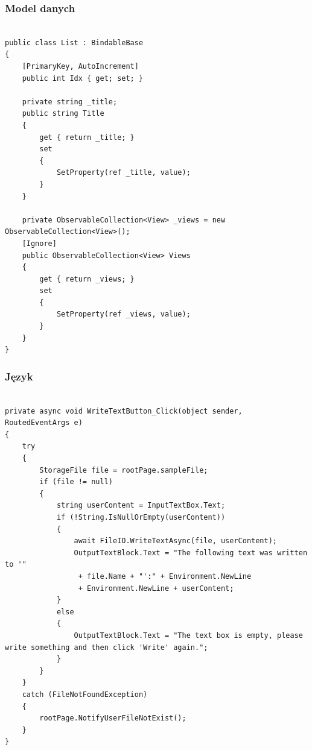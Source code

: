 \begin{frame}[fragile]
\frametitle{Model danych}
 \begin{adjustbox}{width=\textwidth}
\begin{lstlisting}[language=CSharp,basicstyle=\ttfamily]

public class List : BindableBase
{     
    [PrimaryKey, AutoIncrement]
    public int Idx { get; set; }    
	
    private string _title;
    public string Title
    {
        get { return _title; }
        set
        {
            SetProperty(ref _title, value);
        }
    }     
	
    private ObservableCollection<View> _views = new ObservableCollection<View>();
    [Ignore]
    public ObservableCollection<View> Views
    {
        get { return _views; }
        set
        {
            SetProperty(ref _views, value);                
        }
    }
}

\end{lstlisting}
\end{adjustbox}
\end{frame}

\begin{frame}[fragile]
\frametitle{Język \Csharp}
 \begin{adjustbox}{width=\textwidth}
\begin{lstlisting}[language=CSharp,basicstyle=\ttfamily]

private async void WriteTextButton_Click(object sender, RoutedEventArgs e) 
{ 
    try 
    {         
        StorageFile file = rootPage.sampleFile; 
        if (file != null) 
        { 
            string userContent = InputTextBox.Text; 
            if (!String.IsNullOrEmpty(userContent)) 
            { 
                await FileIO.WriteTextAsync(file, userContent); 
                OutputTextBlock.Text = "The following text was written to '"
                 + file.Name + "':" + Environment.NewLine 
                 + Environment.NewLine + userContent; 
            } 
            else 
            { 
                OutputTextBlock.Text = "The text box is empty, please write something and then click 'Write' again."; 
            } 
        } 
    } 
    catch (FileNotFoundException) 
    { 
        rootPage.NotifyUserFileNotExist(); 
    } 
} 
\end{lstlisting}
\end{adjustbox}
\end{frame}



